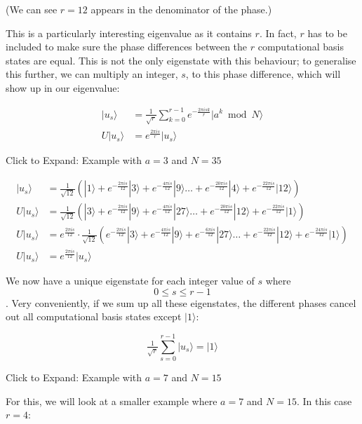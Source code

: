 \documentclass[11pt]{article}
\begin{document}
(We can see \(r = 12\) appears in the denominator of the phase.)

This is a particularly interesting eigenvalue as it contains \(r\). In
fact, \(r\) has to be included to make sure the phase differences
between the \(r\) computational basis states are equal. This is not the
only eigenstate with this behaviour; to generalise this further, we can
multiply an integer, \(s\), to this phase difference, which will show up
in our eigenvalue:

\[\begin{aligned}
|u_s\rangle &= \tfrac{1}{\sqrt{r}}\sum_{k=0}^{r-1}{e^{-\tfrac{2\pi i s k}{r}}|a^k \bmod N\rangle}\\[10pt]
U|u_s\rangle &= e^{\tfrac{2\pi i s}{r}}|u_s\rangle 
\end{aligned}
\]

 Click to Expand: Example with \(a = 3\) and \(N=35\)

\[\begin{aligned}
|u_s\rangle &= \tfrac{1}{\sqrt{12}}(|1\rangle + e^{-\tfrac{2\pi i s}{12}}|3\rangle + e^{-\tfrac{4\pi i s}{12}}|9\rangle \dots + e^{-\tfrac{20\pi i s}{12}}|4\rangle + e^{-\tfrac{22\pi i s}{12}}|12\rangle) \\[10pt]
U|u_s\rangle &= \tfrac{1}{\sqrt{12}}(|3\rangle + e^{-\tfrac{2\pi i s}{12}}|9\rangle + e^{-\tfrac{4\pi i s}{12}}|27\rangle \dots + e^{-\tfrac{20\pi i s}{12}}|12\rangle + e^{-\tfrac{22\pi i s}{12}}|1\rangle) \\[10pt]
U|u_s\rangle &= e^{\tfrac{2\pi i s}{12}}\cdot\tfrac{1}{\sqrt{12}}(e^{-\tfrac{2\pi i s}{12}}|3\rangle + e^{-\tfrac{4\pi i s}{12}}|9\rangle + e^{-\tfrac{6\pi i s}{12}}|27\rangle \dots + e^{-\tfrac{22\pi i s}{12}}|12\rangle + e^{-\tfrac{24\pi i s}{12}}|1\rangle) \\[10pt]
U|u_s\rangle &= e^{\tfrac{2\pi i s}{12}}|u_s\rangle
\end{aligned}\]

We now have a unique eigenstate for each integer value of \(s\) where
\[0 \leq s \leq r-1\]. Very conveniently, if we sum up all these
eigenstates, the different phases cancel out all computational basis
states except \(|1\rangle\):

\[ \tfrac{1}{\sqrt{r}}\sum_{s=0}^{r-1} |u_s\rangle = |1\rangle\]

 Click to Expand: Example with \(a = 7\) and \(N=15\)

For this, we will look at a smaller example where \(a = 7\) and
\(N=15\). In this case \(r=4\):
\end{document}
